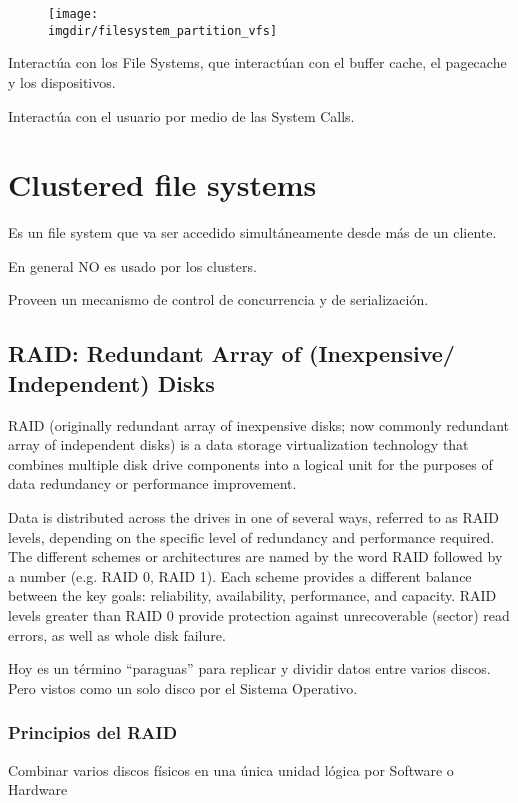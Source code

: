 \documentclass[a4paper, twoside]{article}
\newcommand{\imgdir}{../resources/images} %
\begin{document}
\begin{figure}[H]
	\centering
	\texttt{[image: \\imgdir/filesystem\_partition\_vfs]}
	\label{fig:filesystem_partition_vfs}
\end{figure}

Interactúa con los File Systems, que interactúan con el buffer cache, el pagecache y los dispositivos.

Interactúa con el usuario por medio de las System Calls.

\newpage
\section{Clustered file systems}
Es un file system que va ser accedido simultáneamente desde más de un cliente.

En general NO es usado por los clusters.

Proveen un mecanismo de control de concurrencia y de serialización.

\subsection{RAID: Redundant Array of (Inexpensive/ Independent) Disks}
RAID (originally redundant array of inexpensive disks; now commonly redundant array of independent disks) is a data storage virtualization technology that combines multiple disk drive components into a logical unit for the purposes of data redundancy or performance improvement.

Data is distributed across the drives in one of several ways, referred to as RAID levels, depending on the specific level of redundancy and performance required. The different schemes or architectures are named by the word RAID followed by a number (e.g. RAID 0, RAID 1). Each scheme provides a different balance between the key goals: reliability, availability, performance, and capacity. RAID levels greater than RAID 0 provide protection against unrecoverable (sector) read errors, as well as whole disk failure.

Hoy es un término ``paraguas'' para replicar y dividir datos entre varios discos. Pero vistos como un solo disco por el Sistema Operativo.


\subsubsection{Principios del RAID}
Combinar varios discos físicos en una única unidad lógica por Software o Hardware
\end{document}
